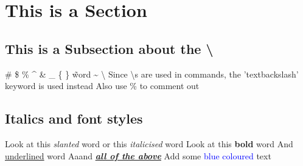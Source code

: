 \documentclass[12pt,twoside,a4paper]{article}
\begin{document}
\section*{This is a Section}



\subsection*{This is a Subsection about the \textbackslash}

\# \$ \% \^{} \& \_ \{ \} \~word \~{} \textbackslash
\newline \newline Since \textbackslash s are used in commands, the 'textbackslash' keyword is used instead
\newline Also use \% to comment out %

\subsection*{Italics and font styles}
Look at this \textsl{slanted} word
\newline or this \textit{italicised} word %
\newline Look at this \textbf{bold} word \newline And \underline{underlined} word
\newline Aaand \textbf{\textit{\underline{all of the above}}}
\newline \newline Add some \textcolor{blue}{blue coloured} text

\newpage
\end{document}
